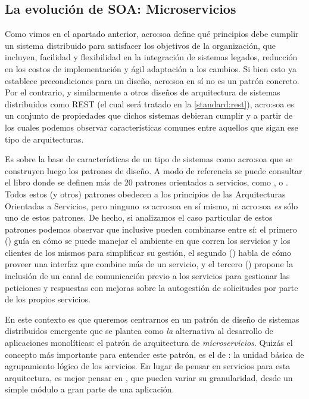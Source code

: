 \subsection{La evolución de SOA: Microservicios}
\label{microservicios}

Como vimos en el apartado anterior, \gls{acro:soa} define qué principios debe cumplir un sistema distribuido para satisfacer los objetivos de la organización, que incluyen, facilidad y flexibilidad en la integración de sistemas legados, reducción en los costos de implementación y ágil adaptación a los cambios. Si bien esto ya establece precondiciones para un diseño, \gls{acro:soa} en sí no es un patrón concreto. Por el contrario, y similarmente a otros diseños de arquitectura de sistemas distribuidos como REST (el cual será tratado en la \autoref{standard:rest}), \gls{acro:soa} es un conjunto de propiedades que dichos sistemas debieran cumplir y a partir de los cuales podemos observar características comunes entre aquellos que sigan ese tipo de arquitecturas.

Es sobre la base de características de un tipo de sistemas como \gls{acro:soa} que se construyen luego los patrones de diseño. A modo de referencia se puede consultar el libro  donde se definen más de 20 patrones orientados a servicios, como \cite[p.~19]{soapatterns}, \cite[p.~148]{soapatterns} o \cite[p.162]{soapatterns}. Todos estos (y otros) patrones obedecen a los principios de las Arquitecturas Orientadas a Servicios, pero ninguno \textit{es} \gls{acro:soa} en sí mismo, ni \gls{acro:soa} \textit{es} sólo uno de estos patrones. De hecho, si analizamos el caso particular de estos patrones podemos observar que inclusive pueden combinarse entre sí: el primero () guía en cómo se puede manejar el ambiente en que corren los servicios y los clientes de los mismos para simplificar su gestión, el segundo () habla de cómo proveer una interfaz que combine más de un servicio, y el tercero () propone la inclusión de un canal de comunicación previo a los servicios para gestionar las peticiones y respuestas con mejoras sobre la autogestión de solicitudes por parte de los propios servicios.

En este contexto es que queremos centrarnos en un patrón de diseño de sistemas distribuidos emergente que se plantea como \textit{la} alternativa al desarrollo de aplicaciones monolíticas: el patrón de arquitectura de \textit{microservicios}. Quizás el concepto más importante para entender este patrón, es el de : la unidad básica de agrupamiento lógico de los servicios. En lugar de pensar en servicios para esta arquitectura, es mejor pensar en , que pueden variar su granularidad, desde un simple módulo a gran parte de una aplicación.

